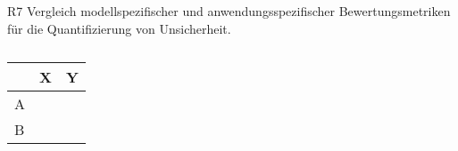 





R7 Vergleich modellspezifischer und anwendungsspezifischer Bewertungsmetriken für die Quantifizierung von Unsicherheit.


\begin{table}[htpb]
  \centering
  \begin{tabular}{|l|l|p{\dimexpr\textwidth-8cm-2\tabcolsep}|}  %
    \hline
    & \textbf{X} & \textbf{Y} \\
    \hline
    A & & \\
    \hline
    B & & \\
    \hline
  \end{tabular}
  \caption{}\label{tab:chapter6r7}
\end{table}





